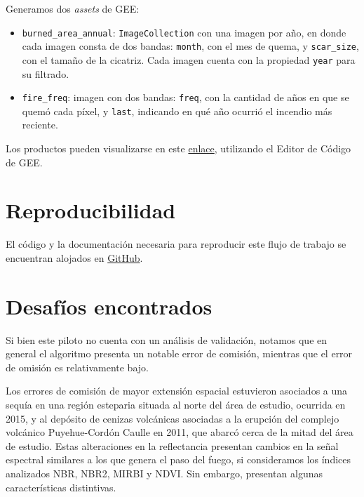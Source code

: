 \documentclass[11pt,a4paper]{article}
\begin{document}
Generamos dos \textit{assets} de GEE: 

\begin{itemize}
  \item \texttt{burned\_area\_annual}: \texttt{ImageCollection} con una imagen por año, en donde cada imagen consta de dos bandas: \texttt{month}, con el mes de quema, y \texttt{scar\_size}, con el tamaño de la cicatriz. Cada imagen cuenta con la propiedad \texttt{year} para su filtrado.
  \item \texttt{fire\_freq}: imagen con dos bandas: \texttt{freq}, con la cantidad de años en que se quemó cada píxel, y \texttt{last}, indicando en qué año ocurrió el incendio más reciente. 
\end{itemize}

Los productos pueden visualizarse en este \href{https://code.earthengine.google.com/b9bf25f7ffff974ed79a6c262e84f65e}{enlace}, utilizando el Editor de Código de GEE.

\section{Reproducibilidad}

El código y la documentación necesaria para reproducir este flujo de trabajo se encuentran alojados en \href{https://github.com/barberaivan/mapbiomas-argentina-fire}{GitHub}.

\section{Desafíos encontrados}

Si bien este piloto no cuenta con un análisis de validación, notamos que en general el algoritmo presenta un notable error de comisión, mientras que el error de omisión es relativamente bajo. 

Los errores de comisión de mayor extensión espacial estuvieron asociados a una sequía en una región esteparia situada al norte del área de estudio, ocurrida en 2015, y al depósito de cenizas volcánicas asociadas a la erupción del complejo volcánico Puyehue-Cordón Caulle en 2011, que abarcó cerca de la mitad del área de estudio. Estas alteraciones en la reflectancia presentan cambios en la señal espectral similares a los que genera el paso del fuego, si consideramos los índices analizados NBR, NBR2, MIRBI y NDVI. Sin embargo, presentan algunas características distintivas. 
\end{document}
